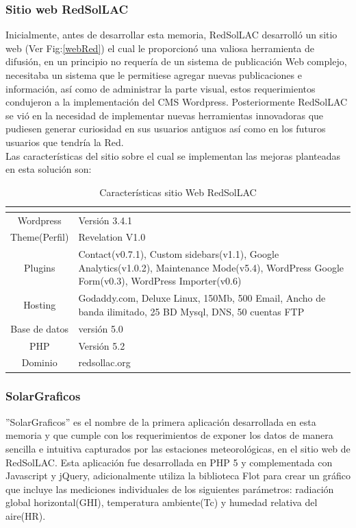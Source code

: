 \subsubsection{Sitio web RedSolLAC}
Inicialmente, antes de desarrollar esta memoria, RedSolLAC desarrolló un sitio web (Ver Fig:\ref{webRed}) el cual le proporcionó una valiosa herramienta de difusión, en un principio no requería de un sistema de publicación Web complejo, necesitaba un sistema que le permitiese agregar nuevas publicaciones e información, así como de administrar la parte visual, estos requerimientos condujeron a la implementación del CMS Wordpress. Posteriormente RedSolLAC se vió en la necesidad de implementar nuevas herramientas innovadoras que pudiesen generar curiosidad en sus usuarios antiguos así como en los futuros usuarios que tendría la Red.\\
Las características del sitio sobre el cual se implementan las mejoras planteadas en esta solución son:
\begin{table}[h!]
\caption{Características sitio Web RedSolLAC}
\begin{tabular}{| c | p{11cm} |}
        \hline
        \textbf{}  &       \textbf{}        \\
        \hline
	Wordpress&Versión 3.4.1\\
	\hline
	Theme(Perfil)&Revelation V1.0\\
	\hline
	Plugins&Contact(v0.7.1), Custom sidebars(v1.1), Google Analytics(v1.0.2), Maintenance Mode(v5.4), WordPress Google Form(v0.3), WordPress Importer(v0.6)\\
	\hline
	Hosting&Godaddy.com, Deluxe Linux, 150Mb, 500 Email, Ancho de banda ilimitado, 25 BD Mysql, DNS, 50 cuentas FTP\\
	\hline
	Base de datos&versión 5.0\\
	\hline
	PHP&Versión 5.2\\
	\hline
	Dominio&redsollac.org\\
	\hline
\end{tabular}
\end{table}

\subsubsection{SolarGraficos}
''SolarGraficos'' es el nombre de la primera aplicación desarrollada en esta memoria y que cumple con los requerimientos de exponer los datos de manera sencilla e intuitiva capturados por las estaciones meteorológicas, en el sitio web de RedSolLAC. Esta aplicación fue desarrollada en PHP 5 y complementada con Javascript y jQuery, adicionalmente utiliza la biblioteca Flot para crear un gráfico que incluye las mediciones individuales de los siguientes parámetros: radiación global horizontal(GHI), temperatura ambiente(Tc) y humedad relativa del aire(HR).\\

